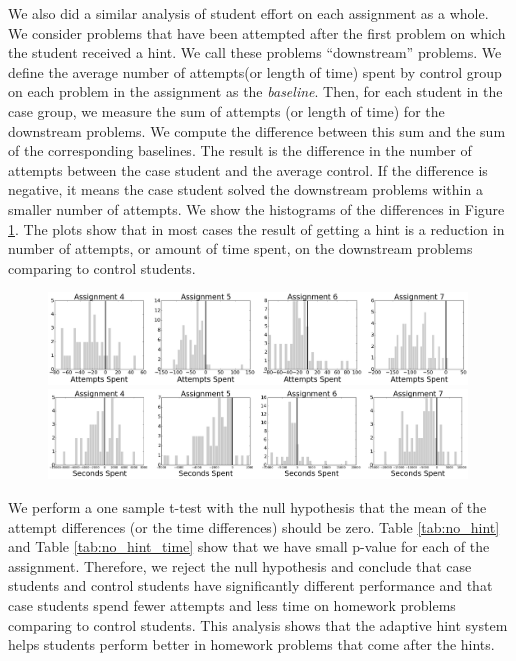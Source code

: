 \documentclass{llncs2e/llncs}
\begin{document}
We also did a similar analysis of student effort on each assignment as a whole. We consider problems that have been attempted after the first problem on which the student received a hint. We call these problems ``downstream'' problems. We define the average number of attempts(or length of time) spent by control group on each problem in the assignment as the {\em baseline}. Then, for each student in the case group, we measure the sum of attempts (or length of time) for the downstream problems. We compute the difference between this sum and the sum of the corresponding baselines. The result is the difference in the number of attempts between the case student and the average control. If the difference is negative, it means the case student solved the downstream problems within a smaller number of attempts. We show the histograms of the differences in Figure \ref{fig:downstream_analysis}. The plots show that in most cases the result of getting a hint is a reduction in number of attempts, or amount of time spent, on the downstream problems comparing to control
students.

\begin{figure}[th]
\centering
	\includegraphics[width=0.99\textwidth]{image/assignment_tries_downstream.png}\\
	\includegraphics[width=0.99\textwidth]{image/assignment_time_downstream.png}
\label{fig:downstream_analysis}

\end{figure}

We perform a one sample t-test with the null hypothesis that the mean of the attempt differences (or the time differences) should be zero. Table \ref{tab:no_hint} and Table \ref{tab:no_hint_time} show that we have small p-value for each of the assignment. Therefore, we reject the null hypothesis and conclude that case students and control students have significantly different performance and that case students spend fewer attempts and less time on homework problems comparing to control students. This analysis shows that the adaptive hint system helps students perform better in homework problems that come after the hints.
\end{document}
